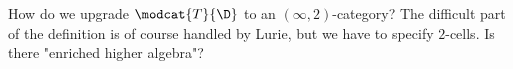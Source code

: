 How do we upgrade $ \modcat{T}{\D} $ to an $ (\infty, 2) $-category?
The difficult part of the definition is of course handled by Lurie,
but we have to specify $ 2 $-cells.
Is there "enriched higher algebra"?
